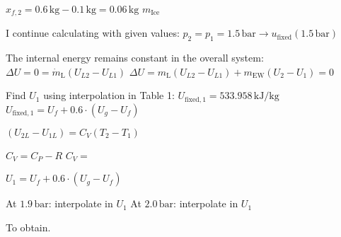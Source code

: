 \( x_{f,2} = 0.6 \, \text{kg} - 0.1 \, \text{kg} = 0.06 \, \text{kg} \)  
\( m_{\text{Ice}} \)  

I continue calculating with given values:  
\( p_2 = p_1 = 1.5 \, \text{bar} \rightarrow u_{\text{fixed}} (1.5 \, \text{bar}) \)  

The internal energy remains constant in the overall system:  
\( \Delta U = 0 = \dot{m}_{\text{L}} (U_{L2} - U_{L1}) \)  
\( \Delta U = m_{\text{L}} (U_{L2} - U_{L1}) + m_{\text{EW}} (U_{2} - U_{1}) = 0 \)  

Find \( U_{1} \) using interpolation in Table 1:  
\( U_{\text{fixed},1} = 533.958 \, \text{kJ/kg} \)  
\( U_{\text{fixed},1} = U_{f} + 0.6 \cdot (U_{g} - U_{f}) \)  

\( (U_{2L} - U_{1L}) = C_{V} (T_{2} - T_{1}) \)  

\( C_{V} = C_{P} - R \)  
\( C_{V} = \)  

\( U_{1} = U_{f} + 0.6 \cdot (U_{g} - U_{f}) \)  

At \( 1.9 \, \text{bar} \): interpolate in \( U_{1} \)  
At \( 2.0 \, \text{bar} \): interpolate in \( U_{1} \)  

To obtain.